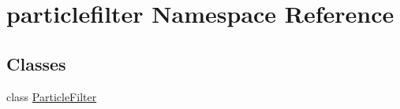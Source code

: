 \section{particlefilter Namespace Reference}
\label{namespaceparticlefilter}
\subsection*{Classes}
\begin{DoxyCompactItemize}
\item 
class \hyperlink{classparticlefilter_1_1ParticleFilter}{Particle\+Filter}
\end{DoxyCompactItemize}
